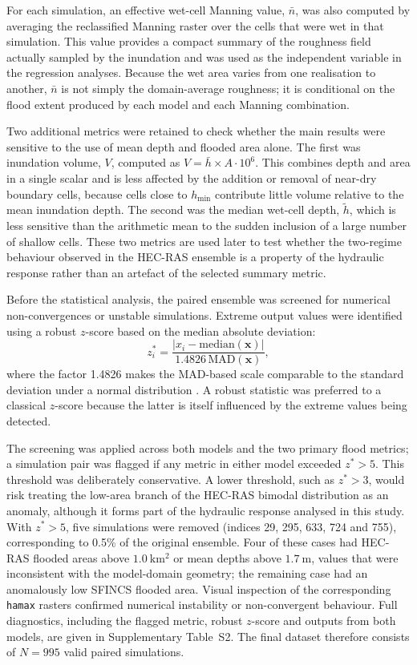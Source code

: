 \documentclass[a4paper,fleqn]{cas-sc}
\newcommand{\sfincs}{\textsc{SFINCS}}
\newcommand{\hecras}{\textsc{HEC-RAS}}
\begin{document}
For each simulation, an effective wet-cell Manning value, $\bar{n}$, was also computed by averaging the reclassified Manning raster over the cells that were wet in that simulation. This value provides a compact summary of the roughness field actually sampled by the inundation and was used as the independent variable in the regression analyses. Because the wet area varies from one realisation to another, $\bar{n}$ is not simply the domain-average roughness; it is conditional on the flood extent produced by each model and each Manning combination.

Two additional metrics were retained to check whether the main results were sensitive to the use of mean depth and flooded area alone. The first was inundation volume, $V$, computed as $V = \bar{h}\times A\cdot10^6$. This combines depth and area in a single scalar and is less affected by the addition or removal of near-dry boundary cells, because cells close to $h_{\min}$ contribute little volume relative to the mean inundation depth. The second was the median wet-cell depth, $\tilde{h}$, which is less sensitive than the arithmetic mean to the sudden inclusion of a large number of shallow cells. These two metrics are used later to test whether the two-regime behaviour observed in the \hecras{} ensemble is a property of the hydraulic response rather than an artefact of the selected summary metric.

Before the statistical analysis, the paired ensemble was screened for numerical non-convergences or unstable simulations. Extreme output values were identified using a robust $z$-score based on the median absolute deviation:
\begin{equation}
z_i^* =
\frac{|x_i - \mathrm{median}(\mathbf{x})|}
{1.4826\,\mathrm{MAD}(\mathbf{x})} ,
\label{eq:robust_z}
\end{equation}
where the factor 1.4826 makes the MAD-based scale comparable to the standard deviation under a normal distribution \citep{rousseeuw1993}. A robust statistic was preferred to a classical $z$-score because the latter is itself influenced by the extreme values being detected.

The screening was applied across both models and the two primary flood metrics; a simulation pair was flagged if any metric in either model exceeded $z^*>5$. This threshold was deliberately conservative. A lower threshold, such as $z^*>3$, would risk treating the low-area branch of the \hecras{} bimodal distribution as an anomaly, although it forms part of the hydraulic response analysed in this study. With $z^*>5$, five simulations were removed (indices 29, 295, 633, 724 and 755), corresponding to 0.5\% of the original ensemble. Four of these cases had \hecras{} flooded areas above $1.0~\mathrm{km^2}$ or mean depths above $1.7~\mathrm{m}$, values that were inconsistent with the model-domain geometry; the remaining case had an anomalously low \sfincs{} flooded area. Visual inspection of the corresponding \texttt{hamax} rasters confirmed numerical instability or non-convergent behaviour. Full diagnostics, including the flagged metric, robust $z$-score and outputs from both models, are given in Supplementary Table~S2. The final dataset therefore consists of $N=\num{995}$ valid paired simulations.
\end{document}
